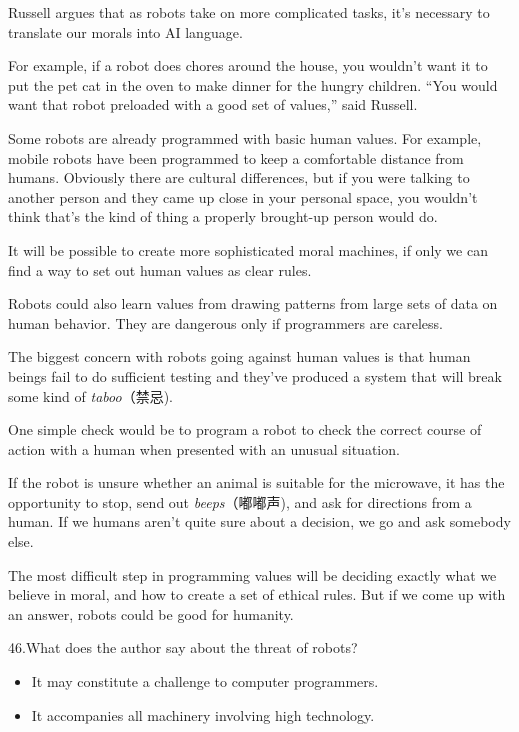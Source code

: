 \documentclass[UTF8,11pt]{ctexart}
\begin{document}
Russell argues that as robots take on more complicated tasks, it's necessary to translate our morals into AI language.


For example, if a robot does chores around the house, you wouldn't want it to put the pet cat in the oven to make dinner for the hungry children. “You would want that robot preloaded with a good set of values,” said Russell.


Some robots are already programmed with basic human values. For example, mobile robots have been programmed to keep a comfortable distance from humans. Obviously there are cultural differences, but if you were talking to another person and they came up close in your personal space, you wouldn't think that's the kind of thing a properly brought-up person would do.


It will be possible to create more sophisticated moral machines, if only we can find a way to set out human values as clear rules.


Robots could also learn values from drawing patterns from large sets of data on human behavior. They are dangerous only if programmers are careless.


The biggest concern with robots going against human values is that human beings fail to do sufficient testing and they've produced a system that will break some kind of\textit{ taboo}（禁忌).


One simple check would be to program a robot to check the correct course of action with a human when presented with an unusual situation.


If the robot is unsure whether an animal is suitable for the microwave, it has the opportunity to stop, send out \textit{beeps}（嘟嘟声), and ask for directions from a human. If we humans aren't quite sure about a decision, we go and ask somebody else.


The most difficult step in programming values will be deciding exactly what we believe in moral, and how to create a set of ethical rules. But if we come up with an answer, robots could be good for humanity.


46.What does the author say about the threat of robots?


\begin{itemize}[leftmargin=2em,itemsep=.2em,topsep=.4em]\item[A.] It may constitute a challenge to computer programmers.
\item[B.] It accompanies all machinery involving high technology.
\end{itemize}
\end{document}
